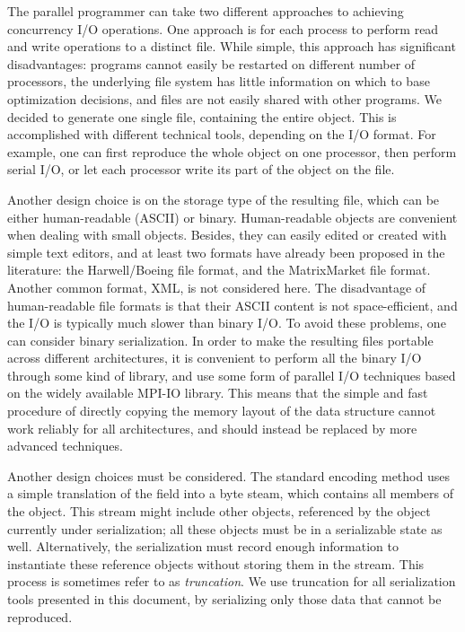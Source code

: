 \documentclass[11pt,relax]{SANDreport}
\begin{document}
The parallel programmer can take two different approaches to achieving
concurrency I/O operations. One approach is for each process to perform read
and write operations to a distinct file. While simple, this approach has
significant disadvantages: programs cannot easily be restarted on different
number of processors, the underlying file system has little information on
which to base optimization decisions, and files are not easily shared with
other programs. We decided to generate one single file, containing the entire
object. This is accomplished with different technical tools, depending on the
I/O format. For example, one can first reproduce the whole object on one
processor, then perform serial I/O, or let each processor write its part of
the object on the file. 

Another design choice is  on the storage type of the resulting file, which 
can be either human-readable (ASCII) or binary.
Human-readable objects are convenient when dealing with small objects.
Besides, they can easily edited or created with simple text editors, and at
least two formats have already been proposed in the literature: the
Harwell/Boeing file format, and the MatrixMarket file format. Another common
format, XML, is not considered here. The
disadvantage of human-readable file formats is that their ASCII content is not
space-efficient, and the I/O is typically much slower than binary I/O. To 
avoid these problems,
one can consider binary serialization. In order to make the resulting files
portable across different architectures, it is convenient to perform all the
binary I/O through some kind of library, and use some form of parallel I/O
techniques based on the widely available MPI-IO library.  This means that the
simple and fast procedure of directly copying the memory layout of the data
structure cannot work reliably for all architectures, and should instead be
replaced by more advanced techniques.

Another design choices must be considered.
The standard encoding method uses a simple translation of the field into a
byte steam, which contains all members of the object. This stream might
include other objects, referenced by the object currently under serialization;
all these objects must be in a serializable state as well. Alternatively, the
serialization must record enough information to instantiate these reference
objects without storing them in the stream. This process is sometimes refer to
as {\sl truncation}. We use truncation for all serialization tools presented
in this document, by serializing only those data that cannot be reproduced.
\end{document}
